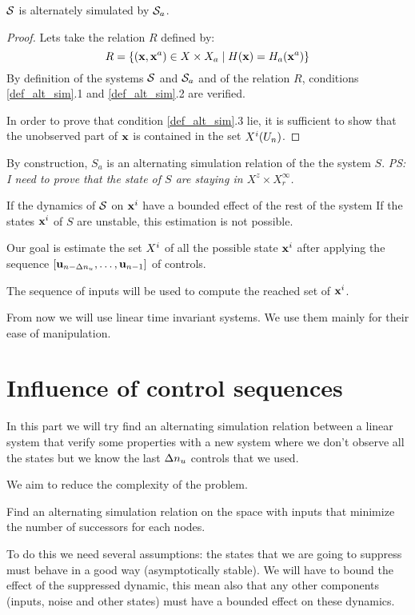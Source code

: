 \begin{prop}
$\mathcal{S}$ is alternately simulated by $\mathcal{S}_a$.
\end{prop}

\begin{proof}
Lets take the relation $R$ defined by:
\begin{equation}
R = \{ ( \mathbf{x}, \mathbf{x}^a) \in X \times X_a \mid H( \mathbf{x}) = H_a( \mathbf{x}^a) \}
\end{equation}
By definition of the systems $\mathcal{S}$ and $\mathcal{S}_a$ and of the relation $R$, conditions \ref{def_alt_sim}.1 and \ref{def_alt_sim}.2 are verified.

In order to prove that condition \ref{def_alt_sim}.3 lie, it is sufficient to show that the unobserved part of $ \mathbf{x}$ is contained in the set $X^i(U_n)$.
\end{proof}

By construction, $S_a$ is an alternating simulation relation of the the system $S$.
\textit{PS: I need to prove that the state of $S$ are staying in $X^z \times X^\infty_r$.}

If the dynamics of $\mathcal{S}$ on $ \mathbf{x}^i$ have a bounded effect of the rest of the system 
If the states $ \mathbf{x}^i$ of $S$ are unstable, this estimation is not possible.

Our goal is estimate the set $X^i$ of all the possible state $ \mathbf{x}^i$ after applying the sequence $[ \mathbf{u}_{n-\Delta n_u},\dots, \mathbf{u}_{n-1}]$ of controls.


The sequence of inputs will be used to compute the reached set of $ \mathbf{x}^i$.

From now we will use linear time invariant systems. We use them mainly for their ease of manipulation.

\section{Influence of control sequences}
In this part we will try find an alternating simulation relation between a linear system that verify some properties with a new system where we don't observe all the states but we know the last $\Delta n_u$ controls that we used.

We aim to reduce the complexity of the problem.

\begin{problem}
Find an alternating simulation relation on the space with inputs that minimize the number of successors for each nodes.
\end{problem}

To do this we need several assumptions: the states that we are going to suppress must behave in a good way (asymptotically stable).
We will have to bound the effect of the suppressed dynamic, this mean also that any other components (inputs, noise and other states) must have a bounded effect on these dynamics.

